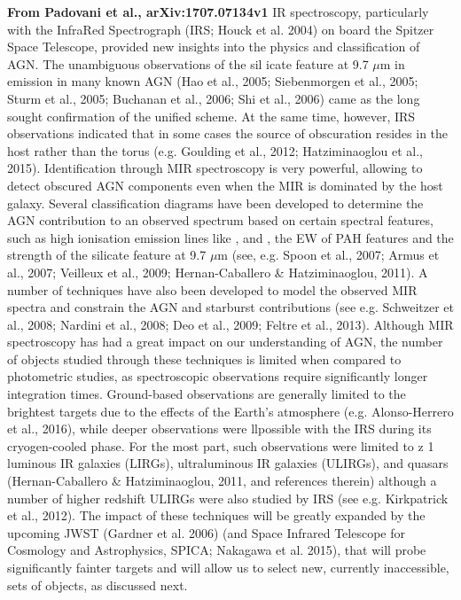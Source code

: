 {\bf From Padovani et al.,  arXiv:1707.07134v1}
IR spectroscopy, particularly with the InfraRed Spectrograph (IRS;
Houck et al. 2004) on board the Spitzer Space Telescope, provided new
insights into the physics and classification of AGN. The unambiguous
observations of the sil icate feature at 9.7 $\mu$m in emission in many
known AGN (Hao et al., 2005; Siebenmorgen et al., 2005; Sturm et al.,
2005; Buchanan et al., 2006; Shi et al., 2006) came as the long sought
confirmation of the unified scheme. At the same time, however, IRS
observations indicated that in some cases the source of obscuration
resides in the host rather than the torus (e.g. Goulding et al., 2012;
Hatziminaoglou et al., 2015).  Identification through MIR spectroscopy
is very powerful, allowing to detect obscured AGN components even
when the MIR is dominated by the host galaxy. Several classification
diagrams have been developed to determine the AGN contribution to an
observed spectrum based on certain spectral features, such as high
ionisation emission lines like \nev, \neii and \oiv, the EW of
PAH features and the strength of the silicate feature at 9.7 $\mu$m (see,
e.g. Spoon et al., 2007; Armus et al., 2007;
Veilleux et al., 2009; Hernan-Caballero \& Hatziminaoglou, 2011). A
number of techniques have also been developed to model the observed
MIR spectra and constrain the AGN and starburst contributions (see
e.g. Schweitzer et al., 2008; Nardini et al., 2008; Deo et al., 2009;
Feltre et al., 2013).  Although MIR spectroscopy has had a great
impact on our understanding of AGN, the number of objects studied
through these techniques is limited when compared to photometric
studies, as spectroscopic observations require significantly longer
integration times. Ground-based observations are generally limited
to the brightest targets due to the effects of the Earth's atmosphere
(e.g. Alonso-Herrero et al., 2016), while deeper observations were
llpossible with the IRS during its cryogen-cooled phase. For the most
part, such observations were limited to z 1 luminous IR galaxies
(LIRGs), ultraluminous IR galaxies (ULIRGs), and quasars (Hernan-Caballero \& Hatziminaoglou, 2011, and references therein) although a
number of higher redshift ULIRGs were also studied by IRS (see
e.g. Kirkpatrick et al., 2012). The impact of these techniques will be
greatly expanded by the upcoming JWST (Gardner et al. 2006) 
(and Space Infrared Telescope for Cosmology and Astrophysics, SPICA; Nakagawa
et al. 2015), 
that will probe significantly fainter targets and will
allow us to select new, currently inaccessible, sets of objects, as
discussed next.


